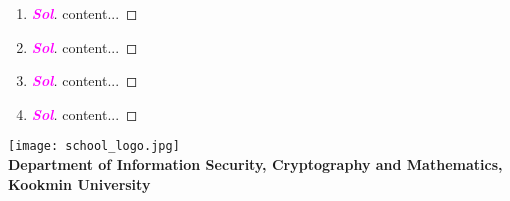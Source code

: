 \documentclass{article}
\newcommand{\footer}[1]{
	\begin{flushright}
		\vspace{2em}
		\texttt{[image: school\_logo.jpg]} \\
		\vspace{1em}
		\textcolor{blue2}{\small\textbf{#1}}
	\end{flushright}
}
\theoremstyle{definition}
\newcommand{\of}[1]{\left( #1 \right)}
\newcommand{\sol}{\textcolor{magenta}{\bf Sol}}
\begin{document}
\begin{enumerate}
\begin{itemize}
		\end{itemize}
		\begin{proof}[\sol]
			\begin{itemize}
				\item[(a)] Let $f\of{z}=e^z$ then \[
				\int_C\frac{e^z}{z}dz=\int_C\frac{f\of{z}}{z-0}dz=f\of{0}2\pi i=2\pi i.
				\]
				\item[(b)] Let $f\of{z}=z^2$ then \[
				\int_C\frac{z^2}{z-1}dz=\int_C\frac{f\of{z}}{z-1}dz=f\of{1}2\pi i=2\pi i.
				\]
				\item[(c)] $\displaystyle\int_C\frac{z}{z-3}dz$
				\item[(d)] $\displaystyle\int_C\frac{\cos z}{z\of{z^2+9}}dz$
			\end{itemize}
		\end{proof}
		\item 
		\begin{proof}[\sol]
			content...
		\end{proof}
		\item 
		\begin{proof}[\sol]
			content...
		\end{proof}
		\item 
		\begin{proof}[\sol]
			content...
		\end{proof}
		\item 
		\begin{proof}[\sol]
			content...
		\end{proof}
	\end{enumerate}
	
	\footer{Department of Information Security, Cryptography and Mathematics, Kookmin University}
\end{document}
